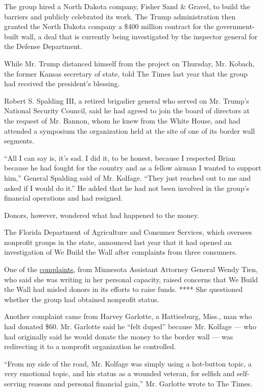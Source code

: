 The group hired a North Dakota company, Fisher Sand \& Gravel, to build
the barriers and publicly celebrated its work. The Trump administration
then granted the North Dakota company a \$400 million contract for the
government-built wall, a deal that is currently being investigated by
the inspector general for the Defense Department.

While Mr. Trump distanced himself from the project on Thursday, Mr.
Kobach, the former Kansas secretary of state, told The Times last year
that the group had received the president's blessing.

Robert S. Spalding III, a retired brigadier general who served on Mr.
Trump's National Security Council, said he had agreed to join the board
of directors at the request of Mr. Bannon, whom he knew from the White
House, and had attended a symposium the organization held at the site of
one of its border wall segments.

``All I can say is, it's sad. I did it, to be honest, because I
respected Brian because he had fought for the country and as a fellow
airman I wanted to support him,'' General Spalding said of Mr. Kolfage.
``They just reached out to me and asked if I would do it.'' He added
that he had not been involved in the group's financial operations and
had resigned.

Donors, however, wondered what had happened to the money.

The Florida Department of Agriculture and Consumer Services, which
oversees nonprofit groups in the state, announced last year that it had
opened an investigation of We Build the Wall after complaints from three
consumers.

One of the
\href{https://int.graylady3jvrrxbe.onion/data/documenttools/brian-kolfage-attorney-general-complaints/df78880e5adbc9fb/full.pdf}{complaints,}
from Minnesota Assistant Attorney General Wendy Tien, who said she was
writing in her personal capacity, raised concerns that We Build the Wall
had misled donors in its efforts to raise funds. **** She questioned
whether the group had obtained nonprofit status.

Another complaint came from Harvey Garlotte, a Hattiesburg, Miss., man
who had donated \$60. Mr. Garlotte said he ``felt duped'' because Mr.
Kolfage --- who had originally said he would donate the money to the
border wall --- was redirecting it to a nonprofit organization he
controlled.

``From my side of the road, Mr. Kolfage was simply using a hot-button
topic, a very emotional topic, and his status as a wounded veteran, for
selfish and self-serving reasons and personal financial gain,'' Mr.
Garlotte wrote to The Times.

